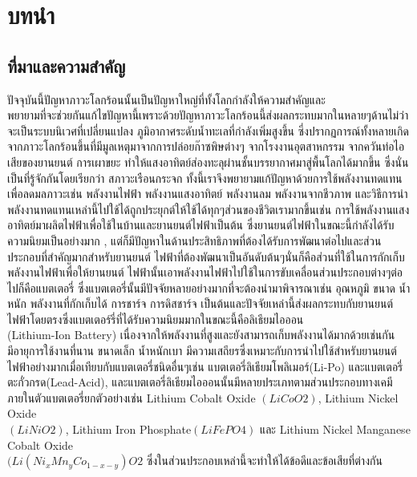 \chapter{บทนำ}
\section{ที่มาและความสำคัญ}
	ปัจจุบันนี้ปัญหาภาวะโลกร้อนนั้นเป็นปัญหาใหญ่ที่ทั้งโลกกำลังให้ความสำคัญและ\\พยายามที่จะช่วยกันแก้ไขปัญหานี้เพราะด้วยปัญหาภาวะโลกร้อนนี้ส่งผลกระทบมากในหลายๆด้านไม่ว่าจะเป็นระบบนิเวศที่เปลี่ยนแปลง ภูมิอากาศระดับน้ำทะเลที่กำลังเพิ่มสูงขึ้น  ซี่งปรากฏการณ์ทั้งหลายเกิดจากภาวะโลกร้อนขึ้นที่มีมูลเหตุมาจากการปล่อยก๊าซพิษต่างๆ จากโรงงานอุตสาหกรรม จากควันท่อไอเสียของยานยนต์ การเผาขยะ ทำให้แสงอาทิตย์ส่องทะลุผ่านชั้นบรรยากาศมาสู่พื้นโลกได้มากขึ้น ซึ่งนั่นเป็นที่รู้จักกันโดยเรียกว่า สภาวะเรือนกระจก \cite{mitchell1989greenhouse} ทั้งนี้เราจึงพยายามแก้ปัญหาด้วยการใช้พลังงานทดแทนเพื่อลดมลภาวะเช่น พลังงานไฟฟ้า พลังงานแสงอาทิตย์ พลังงานลม พลังงานจากชีวภาพ และวิธีการนำพลังงานทดแทนเหล่านี้ไปใช้ได้ถูกประยุกต์ให้ใช้ได้ทุกๆส่วนของชีวิตเรามากขึ้นเช่น การใช้พลังงานแสงอาทิตย์มาผลิตไฟฟ้าเพื่อใช้ในบ้านและยานยนต์ไฟฟ้าเป็นต้น ซึ่งยานยนต์ไฟฟ้าในขณะนี้กำลังได้รับความนิยมเป็นอย่างมาก \cite{cazzola2016global},
	\cite{ding2022integrating} แต่ก็มีปัญหาในด้านประสิทธิภาพที่ต้องได้รับการพัฒนาต่อไปและส่วนประกอบที่สำคัญมากสำหรับยานยนต์ ไฟฟ้าที่ต้องพัฒนาเป็นอันดับต้นๆนั่นก็คือส่วนที่ใช้ในการกักเก็บพลังงานไฟฟ้าเพื่อให้ยานยนต์ ไฟฟ้านั้นเอาพลังงานไฟฟ้าไปใช้ในการขับเคลื่อนส่วนประกอบต่างๆต่อไปก็คือแบตเตอรี่ ซึ่งแบตเตอรี่นั้นมีปัจจัยหลายอย่างมากที่จะต้องนำมาพิจารณาเช่น อุณหภูมิ ขนาด น้ำหนัก พลังงานที่กักเก็บได้ การชาร์จ การดิสชาร์จ เป็นต้นและปัจจัยเหล่านี้ส่งผลกระทบกับยานยนต์ไฟฟ้าโดยตรงซึ่งแบตเตอร์รี่ที่ได้รับความนิยมมากในขณะนี้คือลิเธียมไอออน\\(Lithium-Ion Battery) เนื่องจากให้พลังงานที่สูงและยังสามารถเก็บพลังงานได้มากด้วยเช่นกัน มีอายุการใช้งานที่นาน ขนาดเล็ก น้ำหนักเบา มีความเสถียรซึ่งเหมาะกับการนำไปใช้สำหรับยานยนต์ไฟฟ้าอย่างมากเมื่อเทียบกับแบตเตอรี่ชนิดอื่นๆเช่น แบตเตอรี่ลิเธียมโพลิเมอร์(Li-Po) และแบตเตอรี่ตะกั่วกรด(Lead-Acid)\cite{miao2019current},\cite{wang2019reliability} และแบตเตอรี่ลิเธียมไอออนนั้นมีหลายประเภทตามส่วนประกอบทางเคมีภายในตัวแบตเตอรี่ยกตัวอย่างเช่น Lithium Cobalt Oxide
	$(LiCoO2)$, Lithium Nickel Oxide\\$(LiNiO2)$, Lithium Iron Phosphate$(LiFePO4)$ และ Lithium Nickel Manganese Cobalt Oxide\\$(Li(Ni_xMn_yCo_{1−x−y})O2$ ซึ่งในส่วนประกอบเหล่านี้จะทำให้ได้ข้อดีและข้อเสียที่ต่างกัน\cite{miao2019current}
